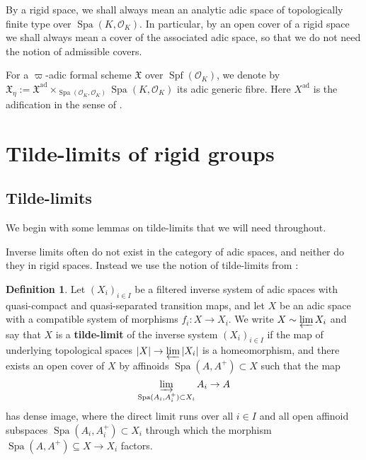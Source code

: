 \documentclass[10pt,oneside]{amsart}
\theoremstyle{definition}
\newtheorem{definition}[theorem]{Definition}
\begin{document}
	By a rigid space, we shall always mean an analytic adic space of topologically finite type over $\operatorname{Spa}(K,\mathcal O_K)$. 
	In particular, by an open cover of a rigid space we shall always mean a cover of the associated adic space, so that we do not need the notion of admissible covers.
	
	For a $\varpi$-adic formal scheme $\mathfrak X$ over $\operatorname{Spf}(\mathcal O_K)$, we denote by $\mathfrak X_\eta:=\mathfrak X^{\mathrm{ad}}\times_{\operatorname{Spa}(\mathcal O_K,\mathcal O_K)}\operatorname{Spa}(K,\mathcal O_K)$ its adic generic fibre. Here $X^{\mathrm{ad}}$ is the adification in the sense of \cite{SW}.


	
	\section{Tilde-limits of rigid groups} \label{section:tilde_limit}
  
	

		\subsection{Tilde-limits} 
	We begin with some lemmas on tilde-limits that we will need throughout.
		
	Inverse limits often do not exist in the category of adic spaces, and neither do they in rigid spaces. Instead we use the notion of tilde-limits from \cite[Definition 2.4.2]{huber2013etale}:	
	\begin{definition} 
Let $(X_i)_{i\in I}$ be a filtered inverse system of adic spaces with quasi-compact and quasi-separated transition maps, and let $X$ be an adic space with a compatible system of morphisms $f_i\colon X \rightarrow X_i$. We write $X \sim \varprojlim X_i$ and say that $X$ is a \textbf{tilde-limit} of the inverse system $(X_i)_{i\in I}$ if the map of underlying topological spaces $|X| \rightarrow \varprojlim |X_i|$ is a homeomorphism, and there exists an open cover of $X$ by affinoids $\operatorname{Spa} (A, A^+) \subset X$ such that the map 
$$ \varinjlim_{\operatorname{Spa}(A_i, A_i^+) \subset X_i} A_i \rightarrow A$$
has dense image, where the direct limit runs over all $i\in I$ and all open affinoid subspaces $\operatorname{Spa}(A_i, A_i^+) \subset X_i$ through which the morphism $\operatorname{Spa}(A, A^+) \subseteq X\rightarrow X_i$ factors.
	\end{definition}
	
\end{document}
